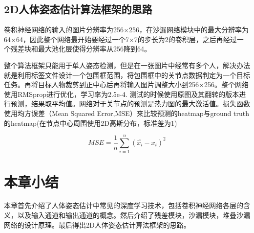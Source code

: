 \subsection{2D人体姿态估计算法框架的思路}

卷积神经网络的输入的图片分辨率为256×256，在沙漏网络模块中的最大分辨率为64×64，因此整个网络最开始要经过一个7×7的步长为2的卷积层，之后再经过一个残差块和最大池化层使得分辨率从256降到64。

整个算法框架只能用于单人姿态检测，但是在一张图片中经常有多个人，解决办法就是利用标签文件设计一个包围框范围，将包围框中的关节点数据判定为一个目标任务。再将目标人物裁剪到正中心后再将输入图片调整大小到256×256。整个网络使用RMSprop进行优化，学习率为2.5e-4. 测试的时候使用原图及其翻转的版本进行预测，结果取平均值。网络对于关节点的预测是热力图的最大激活值。损失函数使用均方误差（Mean Squared Error,MSE）来比较预测的heatmap与ground truth的heatmap(在节点中心周围使用2D高斯分布，标准差为1)

\begin{equation}
MSE = \frac{1}{n}\sum\limits_{i = 1}^n {{{\left( {\widehat {{x_i}} - {x_i}} \right)}^2}}
\end{equation}

\section{本章小结}
本章首先介绍了人体姿态估计中常见的深度学习技术，包括卷积神经网络各层的含义，以及输入通道和输出通道的概念。然后介绍了残差模块，沙漏模块，堆叠沙漏网络的设计原理。最后得出2D人体姿态估计算法框架的思路。
